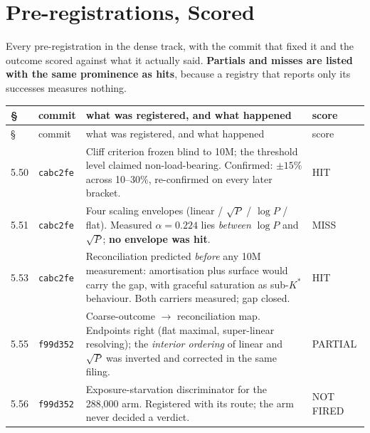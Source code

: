 \section{Pre-registrations, Scored}
\label{app:prereg}

Every pre-registration in the dense track, with the commit that fixed it and the outcome scored
against what it actually said. \textbf{Partials and misses are listed with the same prominence as
hits}, because a registry that reports only its successes measures nothing.

{\footnotesize
\setlength{\LTleft}{0pt}\setlength{\LTright}{0pt}
\begin{longtable}{@{}p{0.9cm}p{1.7cm}p{8.4cm}p{2.3cm}@{}}
\toprule
\S & commit & what was registered, and what happened & score \\
\midrule
\endfirsthead
\toprule
\S & commit & what was registered, and what happened & score \\
\midrule
\endhead
\bottomrule
\endfoot

5.50 & \texttt{cabc2fe} & Cliff criterion frozen blind to 10M; the threshold level claimed
non-load-bearing. Confirmed: $\pm15\%$ across 10--30\%, re-confirmed on every later bracket. & HIT \\

5.51 & \texttt{cabc2fe} & Four scaling envelopes (linear / $\sqrt{P}$ / $\log P$ / flat). Measured
$\alpha = 0.224$ lies \emph{between} $\log P$ and $\sqrt{P}$; \textbf{no envelope was hit}. & MISS \\

5.53 & \texttt{cabc2fe} & Reconciliation predicted \emph{before} any 10M measurement: amortisation
plus surface would carry the gap, with graceful saturation as sub-$K^*$ behaviour. Both carriers
measured; gap closed. & HIT \\

5.55 & \texttt{f99d352} & Coarse-outcome $\to$ reconciliation map. Endpoints right (flat maximal,
super-linear resolving); the \emph{interior ordering} of linear and $\sqrt{P}$ was inverted and
corrected in the same filing. & PARTIAL \\

5.56 & \texttt{f99d352} & Exposure-starvation discriminator for the 288{,}000 arm. Registered with
its route; the arm never decided a verdict. & NOT FIRED \\


\end{longtable}}
